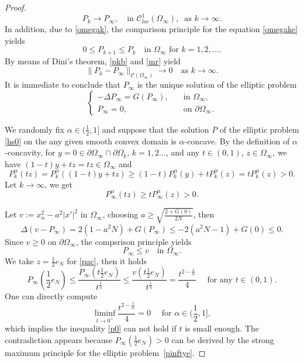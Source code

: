 \documentclass[10pt]{article}         %
\numberwithin{equation}{section}
\begin{document}
\begin{proof}
\[P_{k}\to P_{\infty},\quad \text{in }\mathcal{C}_{loc}^{1}(\Omega_\infty),\ \text{ as }k\to\infty.\]
In addition, due to \eqref{omegak}, the comparison principle for the equation \eqref{omegake} yields 
\begin{equation}\label{mr}
0\leq P_{k+1}\leq P_{k}\quad\text{in }\Omega_\infty\text{ for } k=1,2,....
\end{equation}
By means of Dini's theorem, \eqref{pkb} and \eqref{mr} yield 
\begin{equation*}
    \|P_{k}-P_\infty\|_{\mathcal{C}(\Omega_\infty)}\to0\quad\text{as }k\to\infty.
\end{equation*}
It is immediate to conclude that  $P_{\infty}$ is the unique solution of the elliptic problem
\begin{equation}\label{pinftye}
\begin{cases}
-\Delta P_{\infty}=G(P_{\infty}),\quad &\text{in }\Omega_\infty,\\
P_{\infty}=0,\quad&\text{on }\partial\Omega_\infty.
\end{cases}
\end{equation}






We randomly fix  $\alpha\in(\frac{1}{2},1]$ and suppose that the solution $P$ of the elliptic problem \eqref{hs0} on the any given smooth convex domain is $\alpha$-concave. By the definition of $\alpha$-concavity, for $y=0\in \partial\Omega_\infty\cap\partial\Omega_k$, $k=1,2...$, and any  $t\in (0,1)$, $z\in \Omega_\infty$, we have $(1-t)y+tz=tz\in\Omega_\infty$ and
\begin{equation*}
P_{k}^{\alpha} (tz)=P_{k}^{\alpha} ((1-t)y+tz)\geq (1-t)P_{k}^{\alpha}(y)+tP_{k}^{\alpha}(z)=tP_{k}^{\alpha}(z)>0.
\end{equation*}
Let $k\to\infty$, we get 
\begin{equation}\label{pac}
P_{\infty}^{\alpha} (tz)\geq tP_{\infty}^{\alpha}(z)>0.
\end{equation}


Let  $v:=x_n^2-a^2|x'|^2 $ in $\Omega_\infty$, choosing $a\geq \sqrt{\frac{2+G(0)}{2N}}$, then 
\[\Delta(v-P_{\infty})=2(1-a^2N)+G(P_{\infty})\leq -2(a^2N-1)+G(0)\leq0. \]
Since $v\geq 0$ on $\partial\Omega_\infty$, the compsrison principle yields 
\[P_{\infty}\leq v\quad \text{in }\Omega_\infty.\]
We take $z=\frac{1}{2}e_N$ for \eqref{pac}, then it holds 
\begin{equation}\label{p0}P_{\infty}(\frac{1}{2}e_N)\leq\frac{P_{\infty}(t\frac{1}{2}e_N)}{t^{\frac{1}{\alpha}}}\leq \frac{v(t\frac{1}{2}e_N)}{t^{\frac{1}{\alpha}}}=\frac{t^{2-\frac{1}{\alpha}}}{4}\quad\text{ for any } t\in(0,1).\end{equation}
One can directly compute
\[\liminf\limits_{t\to0^+}\frac{t^{2-\frac{1}{\alpha}}}{4}=0\quad\text{ for }\alpha\in(\frac{1}{2},1],\]
which implies  the inequality  \eqref{p0} can not hold if $t$ is small enough. The contradiction appears because $P_{\infty}(\frac{1}{2}e_N)>0$ can be derived by the strong maximum principle for the elliptic problem~\eqref{pinftye}.








\end{proof}
\end{document}
